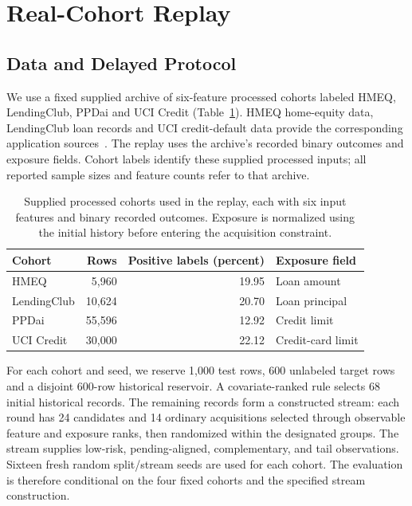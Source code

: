 \documentclass[runningheads]{llncs}
\begin{document}
\section{Real-Cohort Replay}
\label{sec:replay}

\subsection{Data and Delayed Protocol}
We use a fixed supplied archive of six-feature processed cohorts labeled HMEQ, LendingClub, PPDai and UCI Credit (Table~\ref{tab:data}). HMEQ home-equity data, LendingClub loan records and UCI credit-default data provide the corresponding application sources~\cite{sasHMEQ,lendingclubSource,yeh2009comparison}. The replay uses the archive's recorded binary outcomes and exposure fields. Cohort labels identify these supplied processed inputs; all reported sample sizes and feature counts refer to that archive.

\begin{table}[t]
\caption{Supplied processed cohorts used in the replay, each with six input features and binary recorded outcomes. Exposure is normalized using the initial history before entering the acquisition constraint.}
\label{tab:data}
\centering
\small
\begin{tabular}{lrrl}
\toprule
Cohort & Rows & Positive labels (percent) & Exposure field \\
\midrule
HMEQ & 5,960 & 19.95 & Loan amount \\
LendingClub & 10,624 & 20.70 & Loan principal \\
PPDai & 55,596 & 12.92 & Credit limit \\
UCI Credit & 30,000 & 22.12 & Credit-card limit \\
\bottomrule
\end{tabular}
\end{table}


For each cohort and seed, we reserve 1,000 test rows, 600 unlabeled target rows and a disjoint 600-row historical reservoir. A covariate-ranked rule selects 68 initial historical records. The remaining records form a constructed stream: each round has 24 candidates and 14 ordinary acquisitions selected through observable feature and exposure ranks, then randomized within the designated groups. The stream supplies low-risk, pending-aligned, complementary, and tail observations. Sixteen fresh random split/stream seeds are used for each cohort. The evaluation is therefore conditional on the four fixed cohorts and the specified stream construction.
\end{document}

